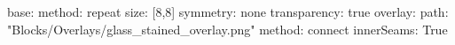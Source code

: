 base:
  method: repeat
  size: [8,8]
  symmetry: none
  transparency: true
overlay:
  path: "Blocks/Overlays/glass_stained_overlay.png"
  method: connect
  innerSeams: True